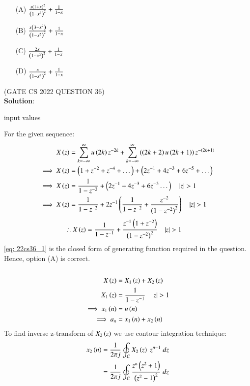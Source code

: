 \documentclass[journal,12pt,twocolumn]{IEEEtran}
\theoremstyle{remark}
\begin{document}
\begin{enumerate}
    \item[(A)] $ \frac{x\left(1+x\right)^2}{\left(1-x^2\right)^2} + \frac{1}{1-x}$
    \item[(B)]$ \frac{x\left(3-x^2\right)}{\left(1-x^2\right)^2} + \frac{1}{1-x}$
    \item[(C)] $ \frac{2x}{\left(1-x^2\right)^2} + \frac{1}{1-x}$
    \item[(D)] $ \frac{x}{\left(1-x^2\right)^2} + \frac{1}{1-x}$  
\end{enumerate}
\hfill(GATE CS 2022 QUESTION 36)\\
\textbf{Solution}:\\
\begin{table}[h!] 
\centering

\caption{input values}
\label{tab: Table2022cs36}
\end{table}
For the given sequence:
\begin{align}
X\brak{z} &= \sum_{k=-\infty}^{\infty} u\brak{2k} z^{-2k}+ \sum_{k=-\infty}^{\infty} \brak{\brak{2k+2}u\brak{2k+1}} z^{-\brak{2k+1}}\\
\implies X\brak{z} &= \brak{1+z^{-2}+z^{-4} + \dots} + \brak{2z^{-1}+4z^{-3} + 6z^{-5} + \dots}\\
\implies X\brak{z} &= \frac{1}{1-z^{-2}} + \brak{2z^{-1}+4z^{-3}+6z^{-5} \dots} \quad |z|>1\\
\implies X\brak{z} &= \frac{1}{1-z^{-2}} +2z^{-1}\brak{\frac{1}{1-z^{-2}}+\frac{z^{-2}}{\brak{1-z^{-2}}^2}} \quad |z|>1
\end{align}
\begin{align}
\therefore X\brak{z} &= \frac{1}{1-z^{-1}} + \frac{z^{-1}\brak{1+z^{-2}}}{\brak{1-z^{-2}}^2} \quad |z|>1 \label{eq: 22cs36_1}
\end{align}
\eqref{eq: 22cs36_1} is the closed form of generating function required in the question.\\
Hence, option (A) is correct.\\\\
\begin{align}
X\brak{z}&=X_1\brak{z}+X_2\brak{z}\\
X_1\brak{z}&=\frac{1}{1-z^{-1}} \quad |z|>1\\ 
\implies x_1\brak{n} &= u\brak{n}\\
\implies a_n&=  x_1\brak{n}+ x_2\brak{n}
\end{align}
To find inverse z-transform of $ X_2\left(z\right)$ we use contour integration technique:
\begin{align}
    x_2\left(n\right)&=\frac{1}{2\pi j}\oint_{C}X_2\left(z\right) \;z^{n-1} \;dz  \\
    &=\frac{1}{2\pi j}\oint_{C}\frac{z^{n}\left(z^2+1\right)}{\left(z^2-1\right)^2} \;dz 
\end{align}
\end{document}
